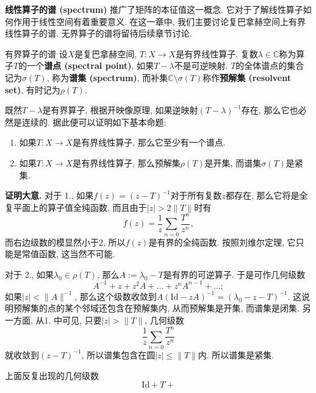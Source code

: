 \textbf{线性算子的谱 (spectrum)} 推广了矩阵的本征值这一概念. 它对于了解线性算子如何作用于线性空间有着重要意义. 在这一章中, 我们主要讨论复巴拿赫空间上有界线性算子的谱. 无界算子的谱将留待后续章节讨论.

\begin{definition}{有界算子的谱}
设$X$是复巴拿赫空间, $T:X\to X$是有界线性算子. 复数$\lambda\in\mathbb{C}$称为算子$T$的一个\textbf{谱点 (spectral point)}, 如果$T-\lambda$不是可逆映射. $T$的全体谱点的集合记为$\sigma(T)$, 称为\textbf{谱集 (spectrum)}, 而补集$\mathbb{C}\setminus\sigma(T)$称作\textbf{预解集 (resolvent set)}, 有时记为$\rho(T)$.
\end{definition}

既然$T-\lambda$是有界算子, 根据开映像原理, 如果逆映射$(T-\lambda)^{-1}$存在, 那么它也必然是连续的. 据此便可以证明如下基本命题:

\begin{theorem}{}
\begin{enumerate}
\item 如果$T:X\to X$是有界线性算子, 那么它至少有一个谱点.
\item 如果$T:X\to X$是有界线性算子, 那么预解集$\rho(T)$是开集, 而谱集$\sigma(T)$是紧集.
\end{enumerate}
\end{theorem}
\textbf{证明大意.} 
对于 1., 如果$f(z)=(z-T)^{-1}$对于所有复数$z$都存在, 那么它将是全复平面上的算子值全纯函数, 而且由于$|z|>2\|T\|$时有
$$
f(z)=\frac{1}{z}\sum_{n=0}\frac{T^n}{z^n},
$$
而右边级数的模显然小于2, 所以$f(z)$是有界的全纯函数. 按照刘维尔定理, 它只能是常值函数, 这当然不可能.

对于 2., 如果$\lambda_0\in\rho(T)$, 那么$A:=\lambda_0-T$是有界的可逆算子. 于是可作几何级数
$$
A^{-1}+z+z^2A+...+z^nA^{n-1}+...;
$$
如果$|z|<\|A\|^{-1}$, 那么这个级数收敛到$A(\text{Id}-zA)^{-1}=(\lambda_0-z-T)^{-1}$. 这说明预解集的点的某个邻域还包含在预解集内, 从而预解集是开集, 而谱集是闭集. 另一方面, 从1. 中可见, 只要$|z|>\|T\|$, 几何级数
$$
\frac{1}{z}\sum_{n=0}\frac{T^n}{z^n}
$$
就收敛到$(z-T)^{-1}$, 所以谱集包含在圆$|z|\leq\|T\|$内. 所以谱集是紧集.

上面反复出现的几何级数
$$
\text{Id}+T+
$$